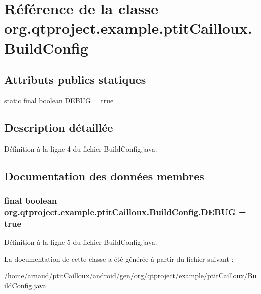 \hypertarget{classorg_1_1qtproject_1_1example_1_1ptit_cailloux_1_1_build_config}{\section{Référence de la classe org.\-qtproject.\-example.\-ptit\-Cailloux.\-Build\-Config}
\label{classorg_1_1qtproject_1_1example_1_1ptit_cailloux_1_1_build_config}
}
\subsection*{Attributs publics statiques}
\begin{DoxyCompactItemize}
\item 
static final boolean \hyperlink{classorg_1_1qtproject_1_1example_1_1ptit_cailloux_1_1_build_config_a1d45be6971693a124a947c2a12c5c59b}{D\-E\-B\-U\-G} = true
\end{DoxyCompactItemize}


\subsection{Description détaillée}


Définition à la ligne 4 du fichier Build\-Config.\-java.



\subsection{Documentation des données membres}
\hypertarget{classorg_1_1qtproject_1_1example_1_1ptit_cailloux_1_1_build_config_a1d45be6971693a124a947c2a12c5c59b}{
\subsubsection[{D\-E\-B\-U\-G}]{\setlength{\rightskip}{0pt plus 5cm}final boolean org.\-qtproject.\-example.\-ptit\-Cailloux.\-Build\-Config.\-D\-E\-B\-U\-G = true\hspace{0.3cm}{\ttfamily [static]}}}\label{classorg_1_1qtproject_1_1example_1_1ptit_cailloux_1_1_build_config_a1d45be6971693a124a947c2a12c5c59b}


Définition à la ligne 5 du fichier Build\-Config.\-java.



La documentation de cette classe a été générée à partir du fichier suivant \-:\begin{DoxyCompactItemize}
\item 
/home/arnaud/ptit\-Cailloux/android/gen/org/qtproject/example/ptit\-Cailloux/\hyperlink{_build_config_8java}{Build\-Config.\-java}\end{DoxyCompactItemize}
